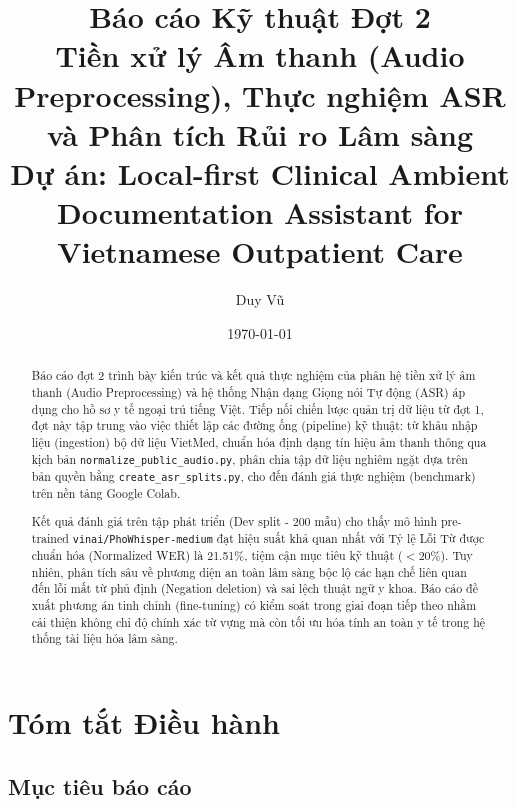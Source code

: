 \documentclass[12pt,a4paper]{article}
\title{
    \textbf{Báo cáo Kỹ thuật Đợt 2}\\
    \large Tiền xử lý Âm thanh (Audio Preprocessing), Thực nghiệm ASR và Phân tích Rủi ro Lâm sàng\\
    \normalsize Dự án: Local-first Clinical Ambient Documentation Assistant for Vietnamese Outpatient Care
}
\author{Duy Vũ}
\date{\today}
\begin{document}
\maketitle

\begin{abstract}
Báo cáo đợt 2 trình bày kiến trúc và kết quả thực nghiệm của phân hệ tiền xử lý âm thanh (Audio Preprocessing) và hệ thống Nhận dạng Giọng nói Tự động (ASR) áp dụng cho hồ sơ y tế ngoại trú tiếng Việt. Tiếp nối chiến lược quản trị dữ liệu từ đợt 1, đợt này tập trung vào việc thiết lập các đường ống (pipeline) kỹ thuật: từ khâu nhập liệu (ingestion) bộ dữ liệu VietMed, chuẩn hóa định dạng tín hiệu âm thanh thông qua kịch bản \texttt{normalize\_public\_audio.py}, phân chia tập dữ liệu nghiêm ngặt dựa trên bản quyền bằng \texttt{create\_asr\_splits.py}, cho đến đánh giá thực nghiệm (benchmark) trên nền tảng Google Colab.

Kết quả đánh giá trên tập phát triển (Dev split - 200 mẫu) cho thấy mô hình pre-trained \texttt{vinai/PhoWhisper-medium} đạt hiệu suất khả quan nhất với Tỷ lệ Lỗi Từ được chuẩn hóa (Normalized WER) là 21.51\%, tiệm cận mục tiêu kỹ thuật ($< 20\%$). Tuy nhiên, phân tích sâu về phương diện an toàn lâm sàng bộc lộ các hạn chế liên quan đến lỗi mất từ phủ định (Negation deletion) và sai lệch thuật ngữ y khoa. Báo cáo đề xuất phương án tinh chỉnh (fine-tuning) có kiểm soát trong giai đoạn tiếp theo nhằm cải thiện không chỉ độ chính xác từ vựng mà còn tối ưu hóa tính an toàn y tế trong hệ thống tài liệu hóa lâm sàng.
\end{abstract}

\tableofcontents
\newpage

\section{Tóm tắt Điều hành}

\subsection{Mục tiêu báo cáo}
\end{document}
